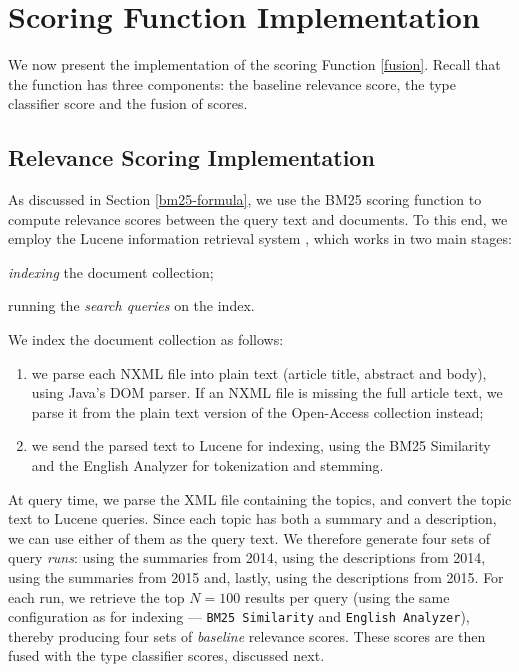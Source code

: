 \section{Scoring Function Implementation}
We now present the implementation of the scoring Function \ref{fusion}. Recall that the function has three components:
the baseline relevance score, the type classifier score and the fusion of scores.

\subsection{Relevance Scoring Implementation}\label{sim-impl}
As discussed in Section \ref{bm25-formula}, we use the \textsf{BM25} scoring function to compute relevance scores between the query
text and documents. To this end, we employ the Lucene information retrieval system \cite{lucene}, which works in two main stages:
\begin{enumerate*}[label=\arabic*)]
 \item \emph{indexing} the document collection;
 \item running the \emph{search queries} on the index.
\end{enumerate*}

We index the document collection as follows:
\begin{enumerate}[label=\arabic*)]
 \item we parse each NXML file into plain text (article title, abstract and body), using Java's DOM parser.
  If an NXML file is missing the full article text, we parse it from the plain text version of the Open-Access collection instead;
 \item we send the parsed text to Lucene for indexing,
    using the BM25 Similarity and the English Analyzer for tokenization and stemming.
\end{enumerate}

At query time, we parse the XML file containing the topics, and convert the topic text to Lucene queries.
Since each topic has both a summary and a description, we can use either of them as the query text.
We therefore
generate four sets of query \emph{runs}: using the summaries from 2014, using the descriptions from 2014, using the summaries from 2015 and,
lastly, using the descriptions from 2015.
For each run, we retrieve the top $N=100$ results per query
(using the same configuration as for indexing --- \texttt{BM25 Similarity} and \texttt{English Analyzer}),
thereby producing four sets of \emph{baseline} relevance scores.
These scores are then fused with the type classifier scores, discussed next.

